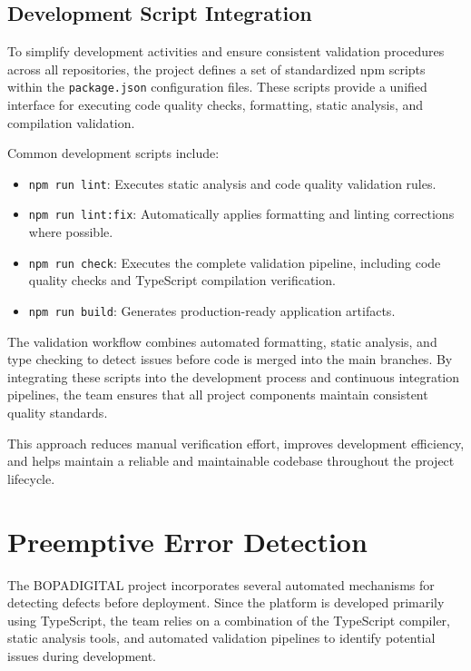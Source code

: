 \documentclass[letterpaper%
, oneside%
, 12pt%
, memoireprojet%
, english%
,creativecommons,hyperref, withAlgo2e %
]{thETS}
\begin{document}
\subsection{Development Script Integration}

To simplify development activities and ensure consistent validation procedures across all repositories, the project defines a set of standardized npm scripts within the \texttt{package.json} configuration files. These scripts provide a unified interface for executing code quality checks, formatting, static analysis, and compilation validation.

Common development scripts include:

\begin{itemize}
\item \texttt{npm run lint}: Executes static analysis and code quality validation rules.
\item \texttt{npm run lint:fix}: Automatically applies formatting and linting corrections where possible.
\item \texttt{npm run check}: Executes the complete validation pipeline, including code quality checks and TypeScript compilation verification.
\item \texttt{npm run build}: Generates production-ready application artifacts.
\end{itemize}

The validation workflow combines automated formatting, static analysis, and type checking to detect issues before code is merged into the main branches. By integrating these scripts into the development process and continuous integration pipelines, the team ensures that all project components maintain consistent quality standards.

This approach reduces manual verification effort, improves development efficiency, and helps maintain a reliable and maintainable codebase throughout the project lifecycle.


\section{Preemptive Error Detection}

The BOPADIGITAL project incorporates several automated mechanisms for detecting defects before deployment. Since the platform is developed primarily using TypeScript, the team relies on a combination of the TypeScript compiler, static analysis tools, and automated validation pipelines to identify potential issues during development.
\end{document}
